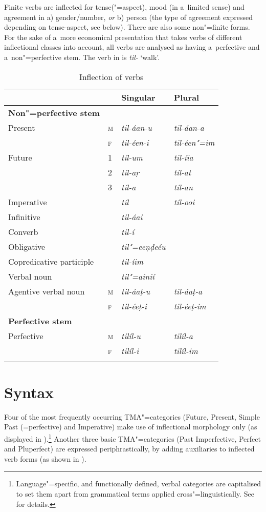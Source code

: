 Finite verbs are inflected for tense("=aspect), mood (in a~limited sense) and agreement in a)
gender/number, \textit{or} b) person (the type of agreement expressed depending on tense-aspect, see 
below). There are also some non"=finite forms. For the sake of a~more economical presentation that
takes verbs of different inflectional classes into account, all verbs are analysed as having
a~perfective and a~non"=perfective stem. The verb in  is \textit{til-} `walk'.


\begin{table}[ht]
\caption{Inflection of verbs}
\begin{tabularx}{\textwidth}{ l l Q Q }
\lsptoprule
&
&
Singular &
Plural \\\hline
\textbf{Non"=perfective stem} &
&
&
\\
Present &
\textsc{m} &
\textit{til-áan-u} &
\textit{til-áan-a} \\
&
\textsc{f} &
\textit{til-éen-i} &
\textit{til-éen"=im} \\
Future &
1 &
\textit{tíl-um} &
\textit{til-íia} \\
&
2 &
\textit{tíl-aṛ} &
\textit{tíl-at} \\
&
3 &
\textit{tíl-a} &
\textit{tíl-an} \\
Imperative &
&
\textit{tíl} &
\textit{tíl-ooi} \\
Infinitive &
&
\textit{til-áai} &
\\
Converb &
&
\textit{til-í} &
\\
Obligative &
&
\textit{til"=eeṇḍeéu} &
\\
Copredicative participle &
&
\textit{til-íim} &
\\
Verbal noun &
&
\textit{til"=ainií} &
\\
Agentive verbal noun &
\textsc{m} &
\textit{til-áaṭ-u} &
\textit{til-áaṭ-a} \\
&
\textsc{f} &
\textit{til-éeṭ-i} &
\textit{til-éeṭ-im} \\
\textbf{Perfective stem} &
&
&
\\
Perfective &
\textsc{m} &
\textit{tilíl-u} &
\textit{tilíl-a} \\
&
\textsc{f} &
\textit{tilíl-i} &
\textit{tilíl-im} \\\lspbottomrule
\end{tabularx}
\label{tab:2-verb}
\end{table}


\section{Syntax}
\label{sec:2-3}
Four of the most frequently occurring TMA"=categories (Future, Present, Simple Past (=perfective) and Imperative) make use of inflectional morphology only (as displayed in ).\footnote{Language"=specific, and functionally defined, verbal categories are capitalised to set them apart from grammatical terms applied cross"=linguistically. See  for details.} Another three basic TMA"=categories (Past Imperfective, Perfect and Pluperfect) are expressed periphrastically, by adding auxiliaries to inflected verb forms (as shown in ).


